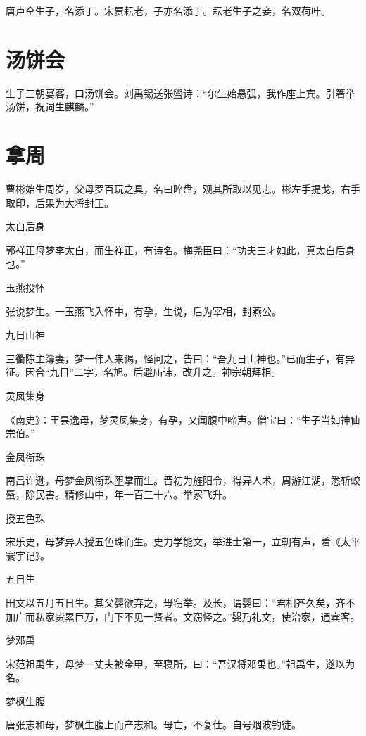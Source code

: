 \documentclass[a4paper,12pt,UTF8,twoside]{ctexbook}
\begin{document}
    唐卢仝生子，名添丁。宋贾耘老，子亦名添丁。耘老生子之妾，名双荷叶。
    
    \section{汤饼会}
    
    生子三朝宴客，曰汤饼会。刘禹锡送张盥诗：“尔生始悬弧，我作座上宾。引箸举汤饼，祝词生麒麟。”
    
    \section{拿周}
    
    曹彬始生周岁，父母罗百玩之具，名曰晬盘，观其所取以见志。彬左手提戈，右手取印，后果为大将封王。
    
    太白后身
    
    郭祥正母梦李太白，而生祥正，有诗名。梅尧臣曰：“功夫三才如此，真太白后身也。”
    
    玉燕投怀
    
    张说梦生。一玉燕飞入怀中，有孕，生说，后为宰相，封燕公。
    
    九日山神
    
    三衢陈主簿妻，梦一伟人来谒，怪问之，告曰：“吾九日山神也。”已而生子，有异征。因合“九日”二字，名旭。后避庙讳，改升之。神宗朝拜相。
    
    灵凤集身
    
    《南史》：王昙逸母，梦灵凤集身，有孕，又闻腹中啼声。僧宝曰：“生子当如神仙宗伯。”
    
    金凤衔珠
    
    南昌许逊，母梦金凤衔珠堕掌而生。晋初为旌阳令，得异人术，周游江湖，悉斩蛟蜃，除民害。精修山中，年一百三十六。举家飞升。
    
    授五色珠
    
    宋乐史，母梦异人授五色珠而生。史力学能文，举进士第一，立朝有声，着《太平寰宇记》。
    
    五日生
    
    田文以五月五日生。其父婴欲弃之，毋窃举。及长，谓婴曰：“君相齐久矣，齐不加广而私家赀累巨万，门下不见一贤者。文窃怪之。”婴乃礼文，使治家，通宾客。
    
    梦邓禹
    
    宋范祖禹生，母梦一丈夫被金甲，至寝所，曰：“吾汉将邓禹也。”祖禹生，遂以为名。
    
    梦枫生腹
    
    唐张志和母，梦枫生腹上而产志和。母亡，不复仕。自号烟波钓徒。
    
\end{document}
